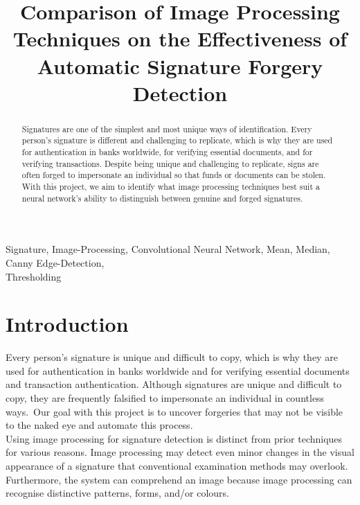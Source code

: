 \documentclass[conference]{IEEEtran}
\begin{document}
\title{Comparison of Image Processing Techniques on the Effectiveness of Automatic Signature Forgery Detection}

\author{
\and
{}
}

\maketitle

\begin{abstract}
Signatures are one of the simplest and most unique ways of identification. Every person’s signature is different and challenging to replicate, which is why they are used
for authentication in banks worldwide, for verifying essential documents, and for verifying transactions. Despite being unique and challenging to replicate, signs are often forged to impersonate an individual so that funds or documents can be stolen. With this project, we aim to identify what image processing techniques best suit a neural network's ability to distinguish between genuine and forged signatures.
\end{abstract}

\begin{IEEEkeywords}
Signature, Image-Processing, Convolutional Neural Network, Mean, Median, Canny Edge-Detection,\\Thresholding
\end{IEEEkeywords}

\section{Introduction}
Every person's signature is unique and difficult to copy, which is why they are used for authentication in banks worldwide and for verifying essential documents and transaction authentication. Although signatures are unique and difficult to copy, they are frequently falsified to impersonate an individual in countless ways. Our goal with this project is to uncover forgeries that may not be visible to the naked eye and automate this process. \\
Using image processing for signature detection is distinct from prior techniques for various reasons. Image processing may detect even minor changes in the visual appearance of a signature that conventional examination methods may overlook. Furthermore, the system can comprehend an image because image processing can recognise distinctive patterns, forms, and/or colours.
\end{document}
